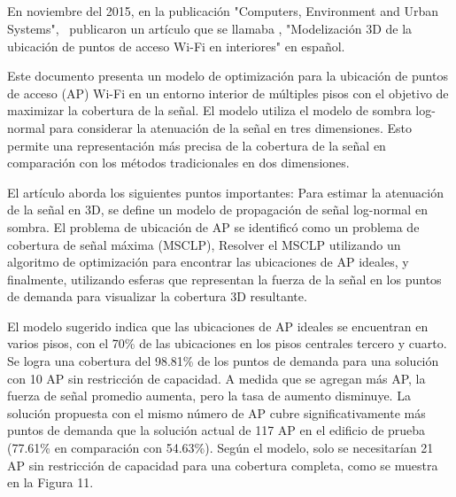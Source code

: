 \subsection{}
En noviembre del 2015, en la publicación "Computers, Environment and Urban Systems", \cite{pr_lee2015coverage3d} publicaron un artículo que se llamaba , "Modelización 3D de la ubicación de puntos de acceso Wi-Fi en interiores" en español.

Este documento presenta un modelo de optimización para la ubicación de puntos de acceso (AP) Wi-Fi en un entorno interior de múltiples pisos con el objetivo de maximizar la cobertura de la señal. El modelo utiliza el modelo de sombra log-normal para considerar la atenuación de la señal en tres dimensiones. Esto permite una representación más precisa de la cobertura de la señal en comparación con los métodos tradicionales en dos dimensiones.

El artículo aborda los siguientes puntos importantes: Para estimar la atenuación de la señal en 3D, se define un modelo de propagación de señal log-normal en sombra. El problema de ubicación de AP se identificó como un problema de cobertura de señal máxima (MSCLP), Resolver el MSCLP utilizando un algoritmo de optimización para encontrar las ubicaciones de AP ideales, y finalmente, utilizando esferas que representan la fuerza de la señal en los puntos de demanda para visualizar la cobertura 3D resultante.

El modelo sugerido indica que las ubicaciones de AP ideales se encuentran en varios pisos, con el 70\% de las ubicaciones en los pisos centrales tercero y cuarto. Se logra una cobertura del 98.81\% de los puntos de demanda para una solución con 10 AP sin restricción de capacidad. A medida que se agregan más AP, la fuerza de señal promedio aumenta, pero la tasa de aumento disminuye. La solución propuesta con el mismo número de AP cubre significativamente más puntos de demanda que la solución actual de 117 AP en el edificio de prueba (77.61\% en comparación con 54.63\%). Según el modelo, solo se necesitarían 21 AP sin restricción de capacidad para una cobertura completa, como se muestra en la Figura 11.


